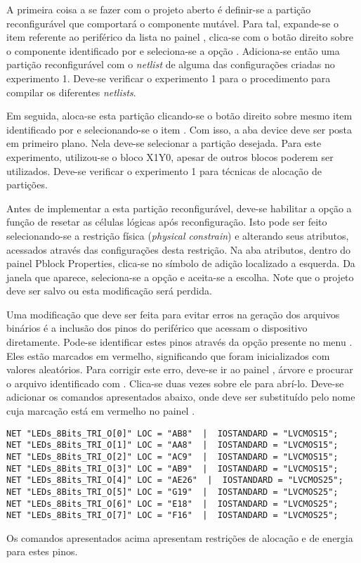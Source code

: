 \documentclass[11pt,a4paper,oneside]{book}
\begin{document}
A primeira coisa a se fazer com o projeto aberto é definir-se a partição reconfigurável que comportará o componente mutável.
Para tal, expande-se o item referente ao periférico da lista no painel , clica-se com o botão direito sobre o componente identificado por  e seleciona-se a opção .
Adiciona-se então uma partição reconfigurável com o \textit{netlist} de alguma das configurações criadas no experimento 1.
Deve-se verificar o experimento 1 para o procedimento para compilar os diferentes \textit{netlists}.

Em seguida, aloca-se esta partição clicando-se o botão direito sobre mesmo item identificado por  e selecionando-se o item .
Com isso, a aba device deve ser posta em primeiro plano.
Nela deve-se selecionar a partição desejada.
Para este experimento, utilizou-se o bloco X1Y0, apesar de outros blocos poderem ser utilizados.
Deve-se verificar o experimento 1 para técnicas de alocação de partições.

Antes de implementar a esta partição reconfigurável, deve-se habilitar a opção a função de resetar as células lógicas após reconfiguração.
Isto pode ser feito selecionando-se a restrição física (\textit{physical constrain}) e alterando seus atributos, acessados através das configurações desta restrição.
Na aba atributos, dentro do painel Pblock Properties, clica-se no símbolo de adição localizado a esquerda.
Da janela que aparece, seleciona-se a opção  e aceita-se a escolha.
Note que o projeto deve ser salvo ou esta modificação será perdida.

Uma modificação que deve ser feita para evitar erros na geração dos arquivos binários é a inclusão dos pinos do periférico que acessam o dispositivo diretamente.
Pode-se identificar estes pinos através da opção  presente no menu .
Eles estão marcados em vermelho, significando que foram inicializados com valores aleatórios.
Para corrigir este erro, deve-se ir ao painel , árvore  e procurar o arquivo identificado com .
Clica-se duas vezes sobre ele para abrí-lo.
Deve-se adicionar os comandos apresentados abaixo, onde  deve ser substituído pelo nome cuja marcação está em vermelho no painel .
\begin{lstlisting}
NET "LEDs_8Bits_TRI_O[0]" LOC = "AB8"  |  IOSTANDARD = "LVCMOS15";
NET "LEDs_8Bits_TRI_O[1]" LOC = "AA8"  |  IOSTANDARD = "LVCMOS15";
NET "LEDs_8Bits_TRI_O[2]" LOC = "AC9"  |  IOSTANDARD = "LVCMOS15";
NET "LEDs_8Bits_TRI_O[3]" LOC = "AB9"  |  IOSTANDARD = "LVCMOS15";
NET "LEDs_8Bits_TRI_O[4]" LOC = "AE26"  |  IOSTANDARD = "LVCMOS25";
NET "LEDs_8Bits_TRI_O[5]" LOC = "G19"  |  IOSTANDARD = "LVCMOS25";
NET "LEDs_8Bits_TRI_O[6]" LOC = "E18"  |  IOSTANDARD = "LVCMOS25";
NET "LEDs_8Bits_TRI_O[7]" LOC = "F16"  |  IOSTANDARD = "LVCMOS25";
\end{lstlisting}
Os comandos apresentados acima apresentam restrições de alocação e de energia para estes pinos.
\end{document}
